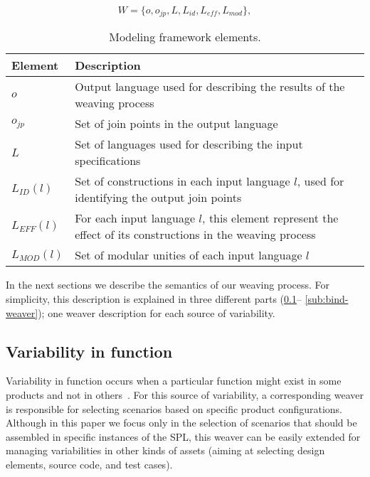 \begin{equation}
W = \{o, o_{jp}, L, L_{id}, L_{eff}, L_{mod}\},
\label{eq:tuple}
\end{equation}

\begin{table}[h]
\begin{center}
\caption{Modeling framework elements.} \label{tab:tup-01}
\begin{tabular}{||p{0.6in}||p{2.4in}||}
  \hline
  {\bf Element} & {\bf Description} \\
   \hline
  $o$              & Output language used for describing the results of the weaving process \\ \hline
  $o_{jp}$       & Set of join points in the output language \\ \hline
  $L$              & Set of languages used for describing the input specifications \\ \hline
  $L_{ID}(l)$      & Set of constructions in each input language $l$, used for identifying the output join points \\ \hline
  $L_{EFF}(l)$   & For each input language $l$, this element represent the effect of its constructions in the weaving process \\ \hline
  $L_{MOD}(l)$  & Set of modular unities of each input language $l$\\ \hline
  \hline
\end{tabular}
\end{center}
\end{table}

In the next sections we describe the semantics of
our weaving process. For simplicity, this description is explained in three
different parts (\ref{sub:pd-weaver}-- \ref{sub:bind-weaver}); one weaver
description for each source of variability. 

\subsection{Variability in function}\label{sub:pd-weaver}

Variability in function occurs when a particular function might exist in some
products and not in others~\cite{Bachmann:2001aa}. For this source of
variability, a corresponding weaver is responsible for selecting scenarios based
on specific product configurations. Although in this paper we focus only in the
selection of scenarios that should be assembled in specific instances of the SPL,
this weaver can be easily extended for managing variabilities in other kinds of
assets (aiming at selecting design elements, source code, and test cases). 

